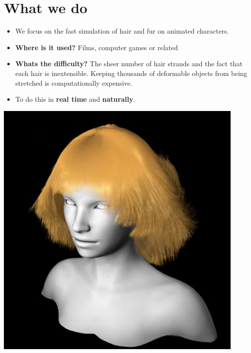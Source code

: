 \documentclass[
paper=192mm:144mm, %
fontsize=12pt, %
pagesize, %
parskip=half-, %
]{scrartcl} %
\theoremstyle{mythmstyle} %
\begin{document}

\section{\color{white}What we do}
\begin{itemize}
\item We focus on the fast simulation of hair and fur on animated characters.
\item \textbf{Where is it used?} Films, computer games or related
\item \textbf{Whats the difficulty?} The sheer number of hair strands and the fact that each hair is inextensible. Keeping thousands of deformable objects from being stretched is computationally expensive.
\item To do this in \textbf{real time} and \textbf{naturally}.
\end{itemize}

\begin{center}
\href{https://youtu.be/zB8Fqbfrrpo?t=106}{\includegraphics[scale=0.4]{Bilder/1.png}}
\end{center}
\end{document}
